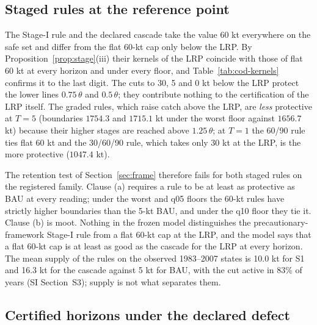 \documentclass[11pt,a4paper]{article}
\theoremstyle{plain}
\theoremstyle{definition}
\theoremstyle{remark}
\newcommand{\LRP}{\theta}
\begin{document}
\subsection{Staged rules at the reference point}\label{sec:cod-staged}

The Stage-I rule and the declared cascade take the value 60 kt everywhere on the safe set and differ from the flat 60-kt cap only below the LRP. By Proposition~\ref{prop:stage}(iii) their kernels of the LRP coincide with those of flat 60 kt at every horizon and under every floor, and Table~\ref{tab:cod-kernels} confirms it to the last digit. The cuts to 30, 5 and 0 kt below the LRP protect the lower lines $0.75\,\LRP$ and $0.5\,\LRP$; they contribute nothing to the certification of the LRP itself. The graded rules, which raise catch above the LRP, are \emph{less} protective at $T=5$ (boundaries $1754.3$ and $1715.1$ kt under the worst floor against $1656.7$ kt) because their higher stages are reached above $1.25\,\LRP$; at $T=1$ the 60/90 rule ties flat 60 kt and the 30/60/90 rule, which takes only 30 kt at the LRP, is the more protective ($1047.4$ kt).

The retention test of Section~\ref{sec:frame} therefore fails for both staged rules on the registered family. Clause (a) requires a rule to be at least as protective as BAU at every reading; under the worst and q05 floors the 60-kt rules have strictly higher boundaries than the 5-kt BAU, and under the q10 floor they tie it. Clause (b) is moot. Nothing in the frozen model distinguishes the precautionary-framework Stage-I rule from a flat 60-kt cap at the LRP, and the model says that a flat 60-kt cap is at least as good as the cascade for the LRP at every horizon. The mean supply of the rules on the observed 1983--2007 states is 10.0 kt for S1 and 16.3 kt for the cascade against 5 kt for BAU, with the cut active in 83\% of years (SI Section~S3); supply is not what separates them.

\subsection{Certified horizons under the declared defect}\label{sec:cod-horizon}
\end{document}

